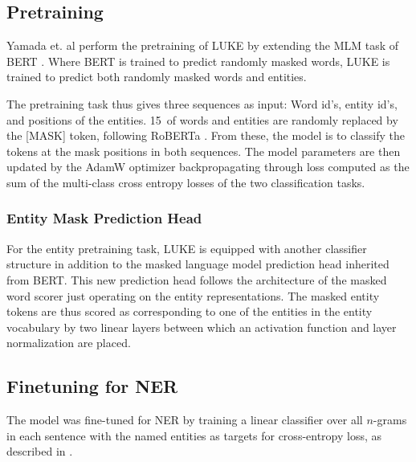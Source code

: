 \documentclass[main.tex]{subfiles}
\begin{document}
\subsection{Pretraining}
Yamada et. al perform the pretraining of LUKE by extending the MLM task of BERT \cite{devlin2019bert}.
Where BERT is trained to predict randomly masked words, LUKE is trained to predict both randomly masked words and entities.

The pretraining task thus gives three sequences as input:
Word id's, entity id's, and positions of the entities.
15\pro\ of words and entities are randomly replaced by the [MASK] token, following RoBERTa \cite{liu2019roberta}.
From these, the model is to classify the tokens at the mask positions in both sequences.
The model parameters are then updated by the AdamW optimizer backpropagating through loss computed as the sum of the multi-class cross entropy losses of the two classification tasks.

\subsubsection{Entity Mask Prediction Head}
For the entity pretraining task, LUKE is equipped with another classifier structure in addition to the masked language model prediction head inherited from BERT.
This new prediction head follows the architecture of the masked word scorer just operating on the entity representations.
The masked entity tokens are thus scored as corresponding to one of the entities in the entity vocabulary by two linear layers between which an activation function and layer normalization are placed.

\subsection{Finetuning for NER}
The model was fine-tuned for NER by training a linear classifier over all $n$-grams in each sentence with the named entities as targets for cross-entropy loss, as described in \cite[Sec. 4.3]{yamada2020luke}.
\end{document}

